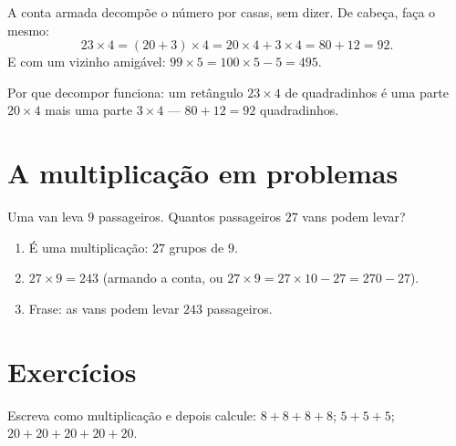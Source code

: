 \begin{example}\label{ex:g3:mult:split}
A conta armada decompõe o número por casas, sem dizer. De cabeça,
faça o mesmo:
\[
23 \times 4 = (20 + 3) \times 4 = 20 \times 4 + 3 \times 4
= 80 + 12 = 92 .
\]
E com um vizinho amigável: $99 \times 5 = 100 \times 5 - 5 = 495$.
\end{example}

\begin{omfigure}

{\small Por que decompor funciona: um retângulo $23 \times 4$ de
quadradinhos é uma parte $20 \times 4$ mais uma parte $3 \times 4$
--- $80 + 12 = 92$ quadradinhos.}
\end{omfigure}

\section{A multiplicação em problemas}

\begin{example}\label{ex:g3:mult:problem}
Uma van leva $9$ passageiros. Quantos passageiros $27$ vans podem
levar?
\begin{enumerate}
  \item É uma multiplicação: $27$ grupos de $9$.
  \item $27 \times 9 = 243$ (armando a conta, ou
        $27 \times 9 = 27 \times 10 - 27 = 270 - 27$).
  \item Frase: as vans podem levar $243$ passageiros.
\end{enumerate}
\end{example}

\section{Exercícios}

\begin{exercise}[$\star$]\label{exo:g3:mult:1}
Escreva como multiplicação e depois calcule:
$8 + 8 + 8 + 8$; \quad $5 + 5 + 5$; \quad
$20 + 20 + 20 + 20 + 20$.
\end{exercise}

